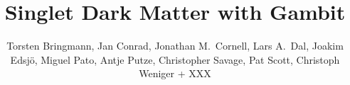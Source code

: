 %
%
%
%
%
%
\RequirePackage{fix-cm}
%
\documentclass[twocolumn,epjc3]{svjour3}  
%
\smartqed  %
%
\RequirePackage{graphicx}
%
%
\RequirePackage{latexsym}
%
%
%


\title{Singlet Dark Matter with Gambit}



\author{Torsten Bringmann, Jan Conrad, Jonathan M.~Cornell, Lars A.~Dal, Joakim Edsj\"o, Miguel Pato, Antje Putze, Christopher Savage, Pat Scott, Christoph Weniger + XXX
}




